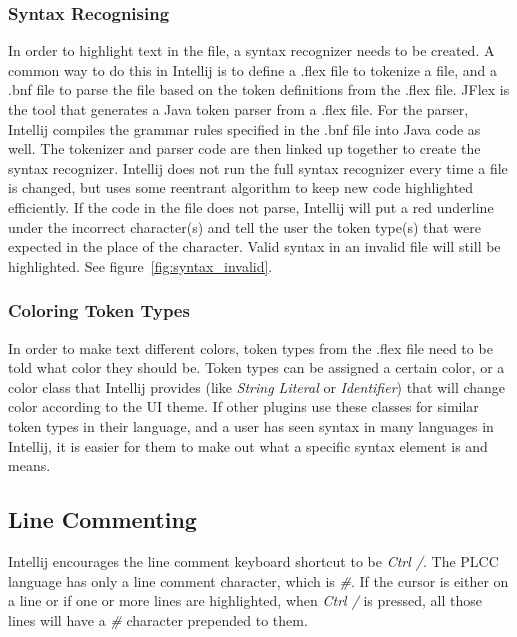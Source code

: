 \documentclass[conference, letterpaper]{IEEEtran}
\begin{document}
\subsubsection{Syntax Recognising}\label{subsubsec:syntax-recognising}
In order to highlight text in the file, a syntax recognizer needs to be created.
A common way to do this in Intellij is to define a .flex file to tokenize a file, and a .bnf file to parse the file based on the token definitions from the .flex file.
JFlex is the tool that generates a Java token parser from a .flex file.
For the parser, Intellij compiles the grammar rules specified in the .bnf file into Java code as well.
The tokenizer and parser code are then linked up together to create the syntax recognizer.
Intellij does not run the full syntax recognizer every time a file is changed, but uses some reentrant algorithm to keep new code highlighted efficiently.
If the code in the file does not parse, Intellij will put a red underline under the incorrect character(s) and tell the user the token type(s) that were expected in the place of the character.
Valid syntax in an invalid file will still be highlighted.
See figure~\ref{fig:syntax_invalid}.

\subsubsection{Coloring Token Types}\label{subsubsec:coloring-token-types}
In order to make text different colors, token types from the .flex file need to be told what color they should be.
Token types can be assigned a certain color, or a color class that Intellij provides (like \textit{String Literal} or \textit{Identifier}) that will change color according to the UI theme.
If other plugins use these classes for similar token types in their language, and a user has seen syntax in many languages in Intellij, it is easier for them to make out what a specific syntax element is and means.

\subsection{Line Commenting}\label{subsec:line-commenting}
Intellij encourages the line comment keyboard shortcut to be \textit{Ctrl /}.
The PLCC language has only a line comment character, which is \textit{\#}.
If the cursor is either on a line or if one or more lines are highlighted, when \textit{Ctrl /} is pressed, all those lines will have a \textit{\#} character prepended to them.
\end{document}
